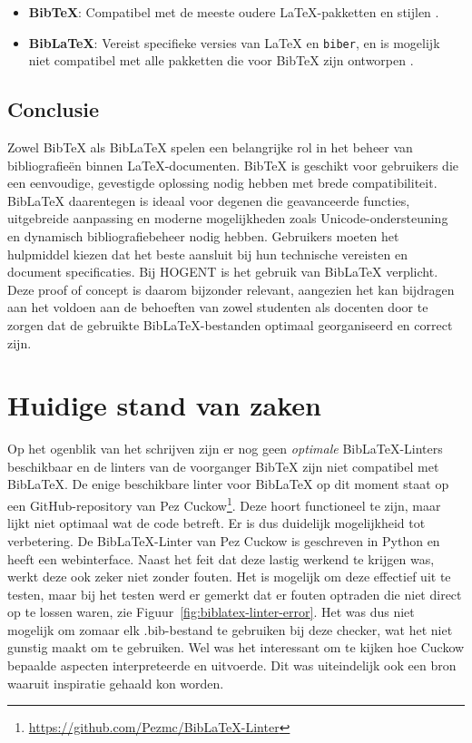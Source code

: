 \begin{itemize}
    \item \textbf{BibTeX}: Compatibel met de meeste oudere \LaTeX{}-pakketten en stijlen \autocite{Patashnik1988}.
    \item \textbf{BibLaTeX}: Vereist specifieke versies van \LaTeX{} en \texttt{biber}, en is mogelijk niet compatibel met alle pakketten die voor BibTeX zijn ontworpen \autocite{Kime2024}.
\end{itemize}

\subsection{Conclusie}
Zowel BibTeX als BibLaTeX spelen een belangrijke rol in het beheer van bibliografieën binnen \LaTeX{}-documenten. BibTeX is geschikt voor gebruikers die een eenvoudige, gevestigde oplossing nodig hebben met brede compatibiliteit. BibLaTeX daarentegen is ideaal voor degenen die geavanceerde functies, uitgebreide aanpassing en moderne mogelijkheden zoals Unicode-ondersteuning en dynamisch bibliografiebeheer nodig hebben. Gebruikers moeten het hulpmiddel kiezen dat het beste aansluit bij hun technische vereisten en document specificaties. Bij HOGENT is het gebruik van BibLaTeX verplicht. Deze proof of concept is daarom bijzonder relevant, aangezien het kan bijdragen aan het voldoen aan de behoeften van zowel studenten als docenten door te zorgen dat de gebruikte BibLaTeX-bestanden optimaal georganiseerd en correct zijn.

\section{Huidige stand van zaken}
Op het ogenblik van het schrijven zijn er nog geen \emph{optimale} BibLaTeX-Linters beschikbaar en de linters van de voorganger BibTeX zijn niet compatibel met BibLaTeX. De enige beschikbare linter voor BibLaTeX op dit moment staat op een GitHub-repository van Pez Cuckow\footnote{\label{foot:pezgithub}\url{https://github.com/Pezmc/BibLaTeX-Linter}}. Deze hoort functioneel te zijn, maar lijkt niet optimaal wat de code betreft. Er is dus duidelijk mogelijkheid tot verbetering. De BibLaTeX-Linter van Pez Cuckow is geschreven in Python en heeft een webinterface. Naast het feit dat deze lastig werkend te krijgen was, werkt deze ook zeker niet zonder fouten. Het is mogelijk om deze effectief uit te testen, maar bij het testen werd er gemerkt dat er fouten optraden die niet direct op te lossen waren, zie Figuur~\ref{fig:biblatex-linter-error}. Het was dus niet mogelijk om zomaar elk .bib-bestand te gebruiken bij deze checker, wat het niet gunstig maakt om te gebruiken. Wel was het interessant om te kijken hoe Cuckow bepaalde aspecten interpreteerde en uitvoerde. Dit was uiteindelijk ook een bron waaruit inspiratie gehaald kon worden.

